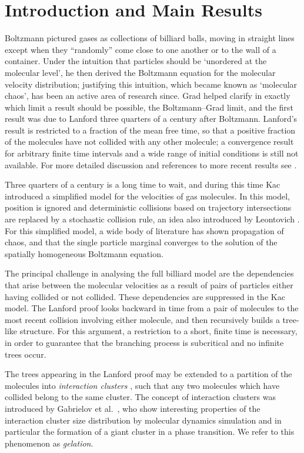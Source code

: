 \section{Introduction and Main Results}

Boltzmann \cite{B96} pictured gases as collections of  billiard balls, moving in straight lines except when they ``randomly'' come close to one another or to the wall of a container. 
Under the intuition that particles should be `unordered at the molecular level', he then derived the Boltzmann equation for the molecular velocity distribution; justifying this intuition, which became known as `molecular chaos', has been an active area of research since. 
Grad helped clarify in exactly which limit a result should be possible, the Boltzmann--Grad limit, and the first result was due to Lanford \cite{L75} three quarters of a century after Boltzmann.
Lanford's result is restricted to a fraction of the mean free time, so that a positive fraction of the molecules have not collided with any other molecule; a convergence result for arbitrary finite time intervals and a wide range of initial conditions is still not available. For more detailed discussion and references to more recent results see \cite{PS17}.

Three quarters of a century is a long time to wait, and during this time Kac \cite{K56} introduced a simplified model for the velocities of gas molecules.
In this model, position is ignored and deterministic collisions based on trajectory intersections are replaced by a stochastic collision rule, an idea also introduced by Leontovich \cite{L35}.
For this simplified model, a wide body of literature \cite{McKean,Grunbaum,Sznitman,MischlerMouhot,N16} has shown propagation of chaos, and that the single particle marginal converges to the solution of the spatially homogeneous Boltzmann equation.

The principal challenge in analysing the full billiard model are the dependencies that arise between the molecular velocities as a result of pairs of particles either having collided or not collided.
These dependencies are suppressed in the Kac model.
The Lanford proof looks backward in time from a pair of molecules to the most recent collision involving either molecule, and then recursively builds a tree-like structure. For this argument, a restriction to a short, finite time is necessary, in order to guarantee that the branching process is subcritical and no infinite trees occur. 

The trees appearing in the Lanford proof may be extended to a partition of the molecules into \emph{interaction clusters} \cite{PSW16}, such that any two molecules which have collided belong to the same cluster.  
The concept of interaction clusters was introduced by Gabrielov et al.~\cite{GKSZ08}, who show interesting properties of the interaction cluster size distribution by molecular dynamics simulation and in particular the formation of a giant cluster in a phase transition. We refer to this phenomenon as \emph{gelation}. 



